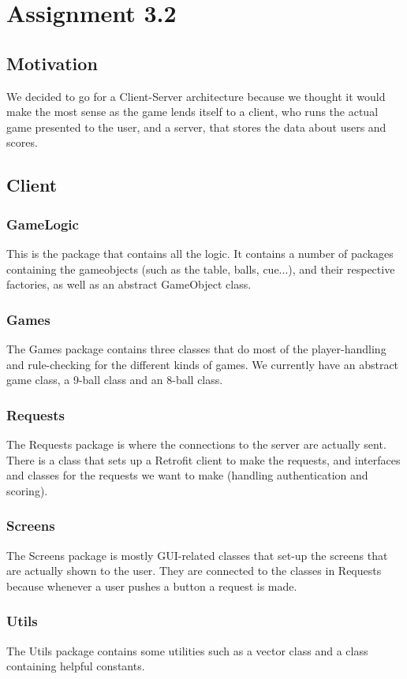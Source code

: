 \documentclass{article}
\begin{document}
\section{Assignment 3.2}
\subsection{Motivation}
We decided to go for a Client-Server architecture because we thought it would make the most sense as the game lends itself to a client, who runs the actual game presented to the user, and a server, that stores the data about users and scores.
\subsection{Client}
\subsubsection{GameLogic}
This is the package that contains all the logic. It contains a number of packages containing the gameobjects (such as the table, balls, cue...), and their respective factories, as well as an abstract GameObject class.

\subsubsection{Games}
The Games package contains three classes that do most of the player-handling and rule-checking for the different kinds of games. We currently have an abstract game class, a 9-ball class and an 8-ball class.
\subsubsection{Requests}
The Requests package is where the connections to the server are actually sent. There is a class that sets up a Retrofit client to make the requests, and interfaces and classes for the requests we want to make (handling authentication and scoring). 
\subsubsection{Screens}
The Screens package is mostly GUI-related classes that set-up the screens that are actually shown to the user. They are connected to the classes in Requests because whenever a user pushes a button a request is made.
\subsubsection{Utils}
The Utils package contains some utilities such as a vector class and a class containing helpful constants. 
\end{document}
